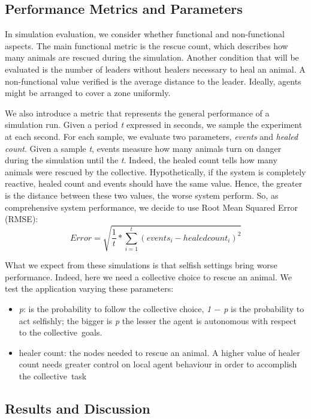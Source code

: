 \documentclass[jsan,article,accept,moreauthors,pdftex]{Definitions/mdpi}
\begin{document}
\begin{paracol}{2}
\subsection{Performance Metrics and Parameters} \label{sb:performance}

In simulation evaluation, we consider whether 
 functional and non-functional aspects.
%
The main functional metric is the rescue count, 
 which describes how many animals are rescued 
 during the simulation. 
%
Another condition that will be evaluated 
 is the number of leaders without healers 
 necessary to heal an animal. 
%
A non-functional value verified is the average distance to the leader.
 Ideally, agents might be arranged to cover a zone uniformly.
% 

We also introduce a metric that represents the general performance of a simulation run.
 Given a period \emph{t} expressed in seconds, we sample the experiment at each second.
 For each sample, we evaluate two parameters, \textit{events} and \textit{healed count}. 
 Given a sample \emph{t}, events measure how many animals turn on danger during the simulation until the \emph{t}. 
 Indeed, the {healed count} tells how many animals were rescued by the collective. 
 Hypothetically, if the system is completely reactive, {healed count} and {events} should have the same value. 
 Hence, the greater is the distance between these two values, the worse system perform. 
 So, as comprehensive system performance, we decide to use Root Mean Squared Error (RMSE):
 $$Error = \sqrt{\frac{1}{t} * \sum\limits_{i=1}^t (events_i - healed count_i)^2} $$


%
What we expect from these simulations is that selfish settings 
 bring worse performance. Indeed, here we need a collective 
 choice to rescue an animal. 
%
We test the application varying these parameters:
\begin{itemize}
  \item \emph{p}: is the probability to follow the collective choice, \emph{1 $-$ p} 
  is the probability to act selfishly;
  the bigger is \emph{p} the lesser the agent is autonomous with respect to the \mbox{collective goals}.
  \item {healer count}: the nodes needed to rescue an animal. A higher value of
  {healer count} needs greater control on local agent behaviour in order to accomplish
  the \mbox{collective task} 
\end{itemize}
%
\subsection{Results and Discussion}\label{sb:results}




\end{paracol}
\end{document}
